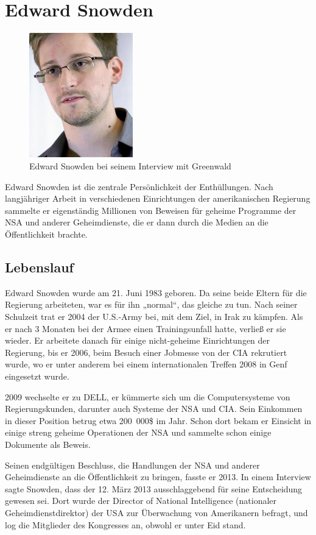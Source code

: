 \documentclass[12pt,a4paper]{scrartcl}
\begin{document}
\section{Edward Snowden}
\begin{figure}
\centering
\includegraphics[width=0.4\textwidth]{images/snowden.jpg}
\caption{Edward Snowden bei seinem Interview mit Greenwald \cite{commons_snowden}}
\end{figure}
Edward Snowden ist die zentrale Persönlichkeit der Enthüllungen. Nach langjähriger Arbeit in verschiedenen Einrichtungen der amerikanischen Regierung sammelte er eigenständig Millionen von Beweisen für geheime Programme der NSA und anderer Geheimdienste, die er dann durch die Medien an die Öffentlichkeit brachte.

\subsection{Lebenslauf}
Edward Snowden wurde am 21. Juni 1983 geboren.
Da seine beide Eltern für die Regierung arbeiteten, war es für ihn „normal“, das gleiche zu tun.
Nach seiner Schulzeit trat er 2004 der U.S.-Army bei, mit dem Ziel, in Irak zu kämpfen. Als er nach 3 Monaten bei der Armee einen Trainingsunfall hatte, verließ er sie wieder.
Er arbeitete danach für einige nicht-geheime Einrichtungen der Regierung, bis er 2006, beim Besuch einer Jobmesse von der CIA rekrutiert wurde, wo er unter anderem bei einem internationalen Treffen 2008 in Genf eingesetzt wurde.
\cite{wiki_snowden}

2009 wechselte er zu DELL, er kümmerte sich um die Computersysteme von Regierungskunden, darunter auch Systeme der NSA und CIA. Sein Einkommen in dieser Position betrug etwa 200~000\$ im Jahr.
Schon dort bekam er Einsicht in einige streng geheime Operationen der NSA und sammelte schon einige Dokumente als Beweis.

Seinen endgültigen Beschluss, die Handlungen der NSA und anderer Geheimdienste an die Öffentlichkeit zu bringen, fasste er 2013. In einem Interview sagte Snowden, dass der 12. März 2013 ausschlaggebend für seine Entscheidung gewesen sei. Dort wurde der Director of National Intelligence (nationaler Geheimdienstdirektor) der USA zur Überwachung von Amerikanern befragt, und log die Mitglieder des Kongresses an, obwohl er unter Eid stand.
\end{document}
